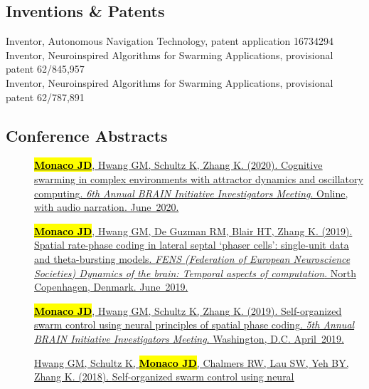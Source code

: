 \documentclass[10pt]{article}
\newcommand{\itemtitle}[1]{{\color{hopkinsblue}\ul{#1}}}
\newcommand{\joehl}[1]{\hl{\textbf{#1}}}
\newcommand{\lefttabline}[3]{\hspace{2ex}\makebox[#1][l]{#2} #3\\}
\begin{document}
\subsection*{Inventions \& Patents}

\lefttabline{0.8in}{1/3/2020}{Inventor, Autonomous Navigation Technology, patent
application 16734294}
\lefttabline{0.8in}{5/10/2019}{Inventor, Neuroinspired Algorithms for Swarming
Applications, provisional patent 62/845,957}
\lefttabline{0.8in}{1/3/2019}{Inventor, Neuroinspired Algorithms for Swarming
Applications, provisional patent 62/787,891}

\subsection*{Conference Abstracts}

\begin{description}
  \item[\quad]
    \href{http://www.cvent.com/events/6th-annual-brain-initiative-investigators-meeting/custom-116-4e2aadaa6cd549a3a4b53113cd172ad2.aspx}
    {\joehl{Monaco JD}, Hwang GM, Schultz K, Zhang K. (2020).
    \itemtitle{Cognitive swarming in complex environments with attractor
        dynamics and oscillatory computing}. \emph{6th Annual BRAIN Initiative
    Investigators Meeting}. Online, with audio narration. June~2020.}
  \item[\quad]
    \href{https://www.fens.org/Meetings/The-Brain-Conferences/Dynamics-of-the-brain/}
    {\joehl{Monaco JD}, Hwang GM, De Guzman RM, Blair HT, Zhang K. (2019).
    \itemtitle{Spatial rate-phase coding in lateral septal ‘phaser cells’:
        single-unit data and theta-bursting models}. \emph{FENS (Federation of
        European Neuroscience Societies) Dynamics of the brain: Temporal aspects of
    computation}. North Copenhagen, Denmark. June~2019.}
  \item[\quad]
    \href{http://www.cvent.com/events/5th-annual-brain-initiative-investigators-meeting/event-summary-de9c0d8f934b46eb8d80b55bcfbfe96a.aspx}
    {\joehl{Monaco JD}, Hwang GM, Schultz K, Zhang K. (2019).
    \itemtitle{Self-organized swarm control using neural principles of spatial
      phase coding}. \emph{5th Annual BRAIN Initiative Investigators Meeting}.
    Washington, D.C. April~2019.} 
  \item[\quad]
    \href{https://abstractsonline.com/pp8/#!/4649/presentation/10884}
    {Hwang GM, Schultz K, \joehl{Monaco JD}, Chalmers RW, Lau SW, Yeh BY,
      Zhang K. (2018). \itemtitle{Self-organized swarm control using neural
}}
\end{description}
\end{document}
